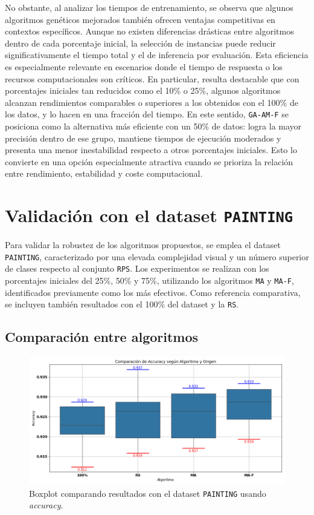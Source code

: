 No obstante, al analizar los tiempos de entrenamiento, 
se observa que algunos algoritmos genéticos mejorados también ofrecen ventajas competitivas en contextos específicos.
Aunque no existen diferencias drásticas entre algoritmos dentro de cada porcentaje inicial, 
la selección de instancias puede reducir significativamente el tiempo total y el de inferencia por evaluación.
Esta eficiencia es especialmente relevante en escenarios donde el tiempo de respuesta o los recursos computacionales son críticos.
En particular, resulta destacable que con porcentajes iniciales tan reducidos como el 10\% o 25\%, 
algunos algoritmos alcanzan rendimientos comparables o superiores a los obtenidos con el 100\% de los datos, y lo hacen en una fracción del tiempo.
En este sentido, \texttt{GA-AM-F} se posiciona como la alternativa más eficiente con un 50\% de datos: 
logra la mayor precisión dentro de ese grupo, mantiene tiempos de ejecución moderados y presenta una menor inestabilidad respecto a otros porcentajes iniciales.
Esto lo convierte en una opción especialmente atractiva cuando se prioriza la relación entre rendimiento, estabilidad y coste computacional.


\section{Validación con el dataset \texttt{PAINTING}}\label{sec:validacion-con-painting}
Para validar la robustez de los algoritmos propuestos, se emplea el dataset \texttt{PAINTING},
caracterizado por una elevada complejidad visual y un número superior de clases respecto al conjunto \texttt{RPS}.
Los experimentos se realizan con los porcentajes iniciales del 25\%, 50\% y 75\%, utilizando los algoritmos \texttt{MA} y \texttt{MA-F}, identificados previamente como los más efectivos.
Como referencia comparativa, se incluyen también resultados con el 100\% del dataset y la \texttt{RS}.

\subsection{Comparación entre algoritmos}

\begin{figure}[htp]
  \centering
  \includegraphics[width=1\textwidth]{imagenes/evaluaciones/painting/comparacion-por-algoritmo.png}
  \caption{Boxplot comparando resultados con el dataset \texttt{PAINTING} usando \textit{accuracy}.}
  \label{fig:comparacion-por-algoritmo}
\end{figure}

